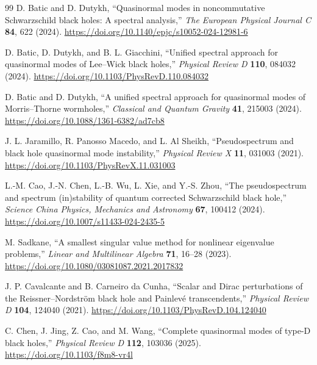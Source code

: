 \documentclass[12pt,a4paper]{article}
\begin{document}
\begin{thebibliography}{99}
D. Batic and D. Dutykh,
``Quasinormal modes in noncommutative Schwarzschild black holes: A spectral analysis,''
\emph{The European Physical Journal C} \textbf{84}, 622 (2024).
\url{https://doi.org/10.1140/epjc/s10052-024-12981-6}

D. Batic, D. Dutykh, and B. L. Giacchini,
``Unified spectral approach for quasinormal modes of Lee--Wick black holes,''
\emph{Physical Review D} \textbf{110}, 084032 (2024).
\url{https://doi.org/10.1103/PhysRevD.110.084032}

D. Batic and D. Dutykh,
``A unified spectral approach for quasinormal modes of Morris--Thorne wormholes,''
\emph{Classical and Quantum Gravity} \textbf{41}, 215003 (2024).
\url{https://doi.org/10.1088/1361-6382/ad7cb8}

J. L. Jaramillo, R. Panosso Macedo, and L. Al Sheikh,
``Pseudospectrum and black hole quasinormal mode instability,''
\emph{Physical Review X} \textbf{11}, 031003 (2021).
\url{https://doi.org/10.1103/PhysRevX.11.031003}

L.-M. Cao, J.-N. Chen, L.-B. Wu, L. Xie, and Y.-S. Zhou,
``The pseudospectrum and spectrum (in)stability of quantum corrected Schwarzschild black hole,''
\emph{Science China Physics, Mechanics and Astronomy} \textbf{67}, 100412 (2024).
\url{https://doi.org/10.1007/s11433-024-2435-5}

M. Sadkane,
``A smallest singular value method for nonlinear eigenvalue problems,''
\emph{Linear and Multilinear Algebra} \textbf{71}, 16--28 (2023).
\url{https://doi.org/10.1080/03081087.2021.2017832}

J. P. Cavalcante and B. Carneiro da Cunha,
``Scalar and Dirac perturbations of the Reissner--Nordstr\"om black hole and Painlev\'e transcendents,''
\emph{Physical Review D} \textbf{104}, 124040 (2021).
\url{https://doi.org/10.1103/PhysRevD.104.124040}

C. Chen, J. Jing, Z. Cao, and M. Wang,
``Complete quasinormal modes of type-D black holes,''
\emph{Physical Review D} \textbf{112}, 103036 (2025).
\url{https://doi.org/10.1103/f8m8-vr4l}

\end{thebibliography}
\end{document}
